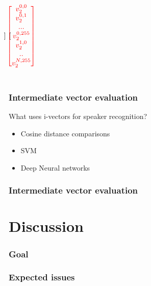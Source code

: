 \documentclass[11pt,english]{beamer}
\begin{document}
\begin{frame}
\begin{columns}
{\begin{equation*}
\begin{bmatrix}
        \end{bmatrix}
        \color{red}{
          \begin{bmatrix}
            v_2^{0,0} \\ v_2^{0,1} \\ ... \\ v_2^{0,255} \\ v_2^{1,0} \\ .. \\
            v_2^{N,255}
          \end{bmatrix}
}
      \end{equation*}
    }
  \end{columns}
  
\end{frame}

\begin{frame}
  \frametitle{Intermediate vector evaluation}
  What uses i-vectors for speaker recognition?
  \begin{itemize}
  \item Cosine distance comparisons
  \item SVM
  \item Deep Neural networks
  \end{itemize}
\end{frame}

\begin{frame}
  \frametitle{Intermediate vector evaluation}
  
\end{frame}

\section{Discussion}

\begin{frame}
  \frametitle{Goal}
  
\end{frame}

\begin{frame}
  \frametitle{Expected issues}
  
\end{frame}
\end{document}
